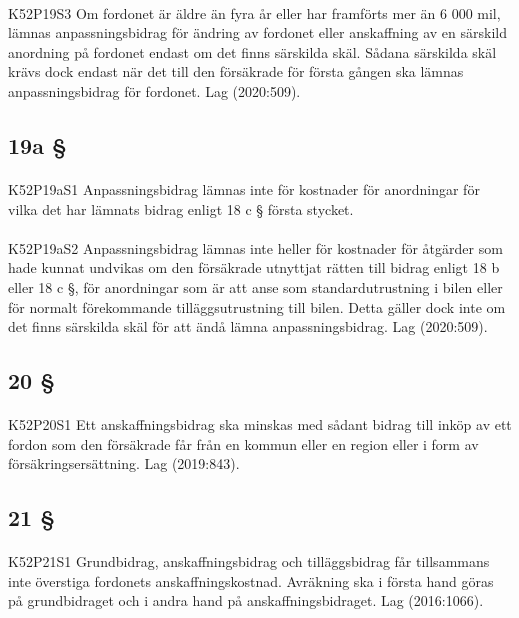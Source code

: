 \documentclass[a4paper,notitlepage,openany,10pt]{book}
\begin{document}
\paragraph*{}
{\tiny K52P19S3}
Om fordonet är äldre än fyra år eller har framförts mer än 6 000 mil, lämnas anpassningsbidrag för ändring av fordonet eller anskaffning av en särskild anordning på fordonet endast om det finns särskilda skäl. Sådana särskilda skäl krävs dock endast när det till den försäkrade för första gången ska lämnas anpassningsbidrag för fordonet.
Lag (2020:509).
\subsection*{19a §}
\paragraph*{}
{\tiny K52P19aS1}
Anpassningsbidrag lämnas inte för kostnader för anordningar för vilka det har lämnats bidrag enligt 18 c § första stycket.
\paragraph*{}
{\tiny K52P19aS2}
Anpassningsbidrag lämnas inte heller för kostnader för åtgärder som hade kunnat undvikas om den försäkrade utnyttjat rätten till bidrag enligt 18 b eller 18 c §, för anordningar som är att anse som standardutrustning i bilen eller för normalt förekommande tilläggsutrustning till bilen. Detta gäller dock inte om det finns särskilda skäl för att ändå lämna anpassningsbidrag.
Lag (2020:509).
\subsection*{20 §}
\paragraph*{}
{\tiny K52P20S1}
Ett anskaffningsbidrag ska minskas med sådant bidrag till inköp av ett fordon som den försäkrade får från en kommun eller en region eller i form av försäkringsersättning.
Lag (2019:843).
\subsection*{21 §}
\paragraph*{}
{\tiny K52P21S1}
Grundbidrag, anskaffningsbidrag och tilläggsbidrag får tillsammans inte överstiga fordonets anskaffningskostnad. Avräkning ska i första hand göras på grundbidraget och i andra hand på anskaffningsbidraget.
Lag (2016:1066).
\end{document}
